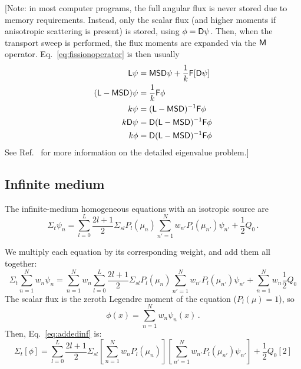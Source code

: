 \documentclass[11pt]{article}
\begin{document}
[Note: in most computer programs, the full angular flux is never stored due to
memory requirements. Instead, only the scalar flux (and higher moments if
anisotropic scattering is present) is stored, using $\phi = \mathsf{D} \psi$. Then,
when the transport sweep is performed, the flux moments are expanded via the
$\mathsf{M}$ operator. Eq.~\eqref{eq:fissionoperator} is then
usually
\begin{align*}
\mathsf{L} \psi &= \mathsf{M} \mathsf{S} \mathsf{D} \psi +  \frac{1}{k} \mathsf{F} [\mathsf{D} \psi]
\\
( \mathsf{L} -  \mathsf{M} \mathsf{S} \mathsf{D} ) \psi &=  \frac{1}{k} \mathsf{F} \phi
\\
k \psi &=  ( \mathsf{L} - \mathsf{M} \mathsf{S} \mathsf{D} ) ^{-1} \mathsf{F} \phi
\\
k \mathsf{D} \psi &= \mathsf{D}  ( \mathsf{L} - \mathsf{M} \mathsf{S} \mathsf{D} ) ^{-1} \mathsf{F} \phi
\\
k \phi &= \mathsf{D} ( \mathsf{L} - \mathsf{M} \mathsf{S} \mathsf{D} ) ^{-1} \mathsf{F} \phi
\end{align*}
See Ref.~\cite{War2004a} for more information on the detailed eigenvalue
problem.]

\subsection{Infinite medium}
The infinite-medium homogeneous \SN{} equations with an isotropic source are
$$\Sigma_t \psi_n 
= \sum_{l=0}^{L}  \frac{2l+1}{2} \Sigma_{sl} P_{l}(\mu_n)
  \sum_{n'=1}^{N} w_{n'} P_{l} (\mu_{n'}) \psi_{n'}
  + \frac{1}{2} Q_0 \,.$$

We multiply each equation by its corresponding weight, and add them all
together:
\begin{equation}
\Sigma_t \sum_{n=1}^{N} w_{n} \psi_{n} 
= \sum_{n=1}^{N} w_{n} \sum_{l=0}^{L}  \frac{2l+1}{2} \Sigma_{sl} P_{l}(\mu_n)
  \sum_{n'=1}^{N} w_{n'} P_{l} (\mu_{n'}) \psi_{n'}
  + \sum_{n=1}^{N} w_{n} \frac{1}{2} Q_0
  \label{eq:addedinf}
\end{equation}
The scalar flux is the zeroth Legendre moment of the equation ($P_l(\mu) = 1$),
so
$$ \phi(x) = \sum_{n=1}^{N} w_{n} \psi_{n}(x) \,.$$
Then, Eq.~\eqref{eq:addedinf} is:
$$ \Sigma_t [\phi] 
= \sum_{l=0}^{L}  \frac{2l+1}{2} \Sigma_{sl} \left[ \sum_{n=1}^{N} w_{n}
P_{l}(\mu_n) \right] \left[ \sum_{n'=1}^{N} w_{n'} P_{l} (\mu_{n'}) \psi_{n'}
\right] + \frac{1}{2} Q_0 [2] $$
\end{document}
